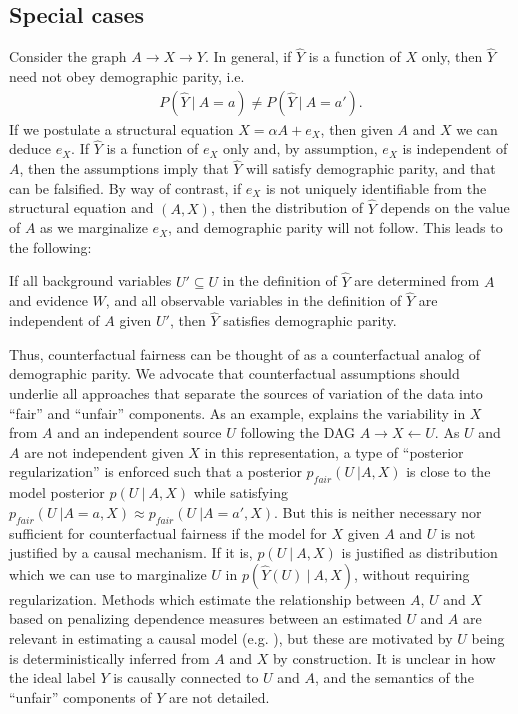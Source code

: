 \subsection{Special cases}
%
Consider the graph $A \rightarrow X \rightarrow Y$. In general, if $\hat Y$ is a function of
$X$ only, then $\hat Y$ need not obey demographic parity, i.e.
\begin{align}
  P(\hat Y\ |\ A = a) \neq P(\hat Y\ |\ A = a').\nonumber
\end{align}
If we postulate a
structural equation $X = \alpha A + e_X$, then given $A$ and $X$ we
can deduce $e_X$. If $\hat Y$ is a function of $e_X$ only and, by
assumption, $e_X$ is independent of $A$, then the assumptions imply
that $\hat Y$ will satisfy demographic parity, and that can be
falsified.
By way of contrast, if $e_X$ is not uniquely identifiable from the structural equation and $(A, X)$, then the distribution of $\hat Y$ depends on the value of $A$ as we marginalize $e_X$, and demographic parity will not follow. This leads to the following:
%
\begin{lem}
If all background variables $U' \subseteq U$ in the definition of $\hat Y$ are determined from $A$ and evidence $W$, 
and all observable variables in the definition of $\hat Y$ are independent of $A$ given $U'$, then $\hat Y$ satisfies demographic parity. %
\end{lem}
  
Thus, counterfactual fairness can be thought of as a counterfactual analog of demographic parity. We advocate that counterfactual assumptions should underlie all
approaches that separate the sources of variation of the data into
``fair'' and ``unfair'' components. As an example,
\citet{louizos2015variational} explains the variability in $X$ from
$A$ and an independent source $U$ following the DAG
$A \rightarrow X \leftarrow U$. As $U$ and $A$ are not independent
given $X$ in this representation, a type of ``posterior
regularization'' \citep{ganchev:10} is enforced such that a posterior
$p_{fair}(U\ | A, X)$ is close to the model posterior $p(U\ |\ A, X)$
while satisfying
$p_{fair}(U\ | A = a, X) \approx p_{fair}(U\ | A = a', X)$. But this
is neither necessary nor sufficient for counterfactual fairness if the
model for $X$ given $A$ and $U$ is not justified by a causal
mechanism. If it is, $p(U\ |\ A, X)$ is justified as distribution
which we can use to marginalize $U$ in $p(\hat Y(U)\ |\ A, X)$, without requiring regularization.
%
Methods which estimate the
relationship between $A$, $U$ and $X$ based on penalizing dependence
measures between an estimated $U$ and $A$ are relevant in estimating a
causal model (e.g. \citet{mooij:09}), but these
are motivated by  $U$ being is deterministically inferred
from $A$ and $X$ by construction. It is unclear in
\citet{louizos2015variational} how the ideal label $Y$ is causally
connected to $U$ and $A$, and the semantics of the ``unfair''
components of $Y$ are not detailed. %


